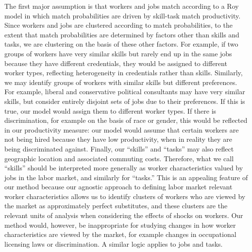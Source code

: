 \documentclass[12pt]{article}
\theoremstyle{definition}
\theoremstyle{plain}
\begin{document}
The first major assumption is that workers and jobs match according to a Roy model in which match probabilities are driven by skill-task match productivity. Since workers and jobs are clustered according to match probabilities, to the extent that match probabilities are determined by factors other than skills and tasks, we are clustering on the basis of these other factors. For example, if two groups of workers have very similar skills but rarely end up in the same jobs because they have different credentials, they would be assigned to different worker types, reflecting heterogeneity in credentials rather than skills. Similarly, we may identify groups of workers with similar skills but different preferences. For example, liberal and conservative political consultants may have very similar skills, but consider entirely disjoint sets of jobs due to their preferences. If this is true, our model would assign them to different worker types. If there is discrimination, for example on the basis of race or gender, this would be reflected in our productivity measure: our model would assume that certain workers are not being hired because they have low productivity, when in reality they are being discriminated against. Finally, our ``skills'' and ``tasks'' may also reflect geographic location and associated commuting costs. Therefore, what we call ``skills'' should be interpreted more generally as worker characteristics valued by jobs in the labor market, and similarly for ``tasks.'' This is an appealing feature of our method because our agnostic approach to defining labor market relevant worker characteristics allows us to identify clusters of workers who are viewed by the market as approximately perfect substitutes, and these clusters are the relevant units of analysis when considering the effects of shocks on workers. Our method would, however, be inappropriate for studying changes in how worker characteristics are viewed by the market, for example changes in occupational licensing laws or discrimination.  A similar logic applies to jobs and tasks.
\end{document}
